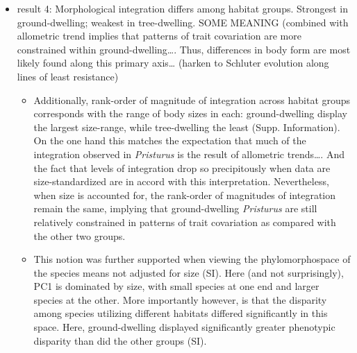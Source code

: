 \documentclass[
  11pt,
]{article}
\providecommand{\tightlist}{%
  \setlength{\itemsep}{0pt}\setlength{\parskip}{0pt}}
\begin{document}
\begin{itemize}
\tightlist
\item
  result 4: Morphological integration differs among habitat groups.
  Strongest in ground-dwelling; weakest in tree-dwelling. SOME MEANING
  (combined with allometric trend implies that patterns of trait
  covariation are more constrained within ground-dwelling\ldots. Thus,
  differences in body form are most likely found along this primary
  axis\ldots{} (harken to Schluter evolution along lines of least
  resistance)

  \begin{itemize}
  \tightlist
  \item
    Additionally, rank-order of magnitude of integration across habitat
    groups corresponds with the range of body sizes in each:
    ground-dwelling display the largest size-range, while tree-dwelling
    the least (Supp. Information). On the one hand this matches the
    expectation that much of the integration observed in
    \emph{Pristurus} is the result of allometric trends\ldots. And the
    fact that levels of integration drop so precipitously when data are
    size-standardized are in accord with this interpretation.
    Nevertheless, when size is accounted for, the rank-order of
    magnitudes of integration remain the same, implying that
    ground-dwelling \emph{Pristurus} are still relatively constrained in
    patterns of trait covariation as compared with the other two
    groups.\\
  \item
    This notion was further supported when viewing the phylomorphospace
    of the species means not adjusted for size (SI). Here (and not
    surprisingly), PC1 is dominated by size, with small species at one
    end and larger species at the other. More importantly however, is
    that the disparity among species utilizing different habitats
    differed significantly in this space. Here, ground-dwelling
    displayed significantly greater phenotypic disparity than did the
    other groups (SI).
  \end{itemize}
\end{itemize}
\end{document}
